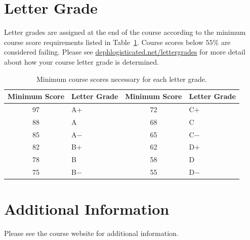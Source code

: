 \documentclass[letterpaper,oneside,onecolumn,11pt,article]{memoir}
\begin{document}
\section{Letter Grade}
Letter grades are assigned at the end of the course according to the minimum course score requirements listed in Table~\ref{tab:lettergrades}. Course scores below $55\%$ are considered failing. Please see \href{https://dephlogisticated.net/lettergrades}{dephlogisticated.net/lettergrades} for more detail about how your course letter grade is determined. 
\begin{table}[h]
\caption{\sffamily Minimum course scores necessary for each letter grade.}
\label{tab:lettergrades}
\begin{tabular}{cl||cl} \toprule
\textbf{Minimum Score} & \textbf{Letter Grade} & \textbf{Minimum Score} & \textbf{Letter Grade} \\ \hline
97 & \hspace{0.3in}A$+$ & 72 & \hspace{0.3in}C$+$ \\
88 & \hspace{0.3in}A & 68 & \hspace{0.3in}C \\
85 & \hspace{0.3in}A$-$ & 65 & \hspace{0.3in}C$-$ \\
82 & \hspace{0.3in}B$+$ & 62 & \hspace{0.3in}D$+$ \\
78 & \hspace{0.3in}B & 58 & \hspace{0.3in}D \\
75 & \hspace{0.3in}B$-$ & 55 & \hspace{0.3in}D$-$ \\
\bottomrule
\end{tabular}
\end{table}
%
%
\section{Additional Information}
Please see the course website for additional information. 
%
%
\end{document}
